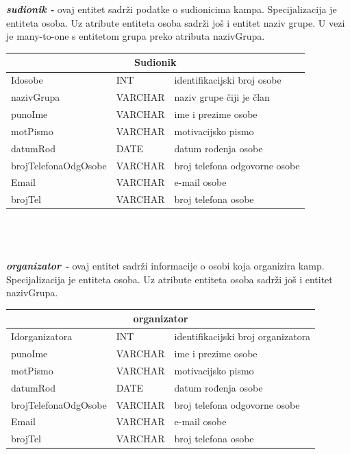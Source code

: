 \\
\\
\textbf{\textit{sudionik -}} ovaj entitet sadrži podatke o sudionicima kampa. Specijalizacija je entiteta osoba. Uz atribute entiteta osoba sadrži još i entitet naziv grupe. U vezi je many-to-one s entitetom grupa preko atributa nazivGrupa.\\
\begin{tabular}{|l|l|l|}
	
	\hline \multicolumn{3}{|c|}{\textbf{Sudionik}}\\ \hline
	
	\cellcolor{aquamarine}Idosobe & INT	&  	identifikacijski broj osobe\\ \hline
	\cellcolor{blizzardblue}nazivGrupa	& VARCHAR &   naziv grupe čiji je član	\\ \hline 
	punoIme	& VARCHAR &   ime i prezime osobe	\\ \hline 
	motPismo & VARCHAR &  motivacijsko pismo \\ \hline 
	datumRod & DATE	&  	datum rođenja osobe	\\ \hline 
	brojTelefonaOdgOsobe & 	VARCHAR	&	broj telefona odgovorne osobe \\ \hline
	Email &	VARCHAR	&	e-mail osobe \\ \hline
	brojTel	&	VARCHAR	&	broj telefona osobe \\ \hline
\end{tabular} \\ \\
\\
\textbf{\textit{organizator -}} ovaj entitet sadrži informacije o osobi koja organizira kamp. Specijalizacija je entiteta osoba. Uz atribute entiteta osoba sadrži još i entitet nazivGrupa.\\
\begin{tabular}{|l|l|l|}
	
	\hline \multicolumn{3}{|c|}{\textbf{organizator}}\\	 \hline
	
	\cellcolor{aquamarine}Idorganizatora & INT	&  	identifikacijski broj organizatora\\ \hline
	punoIme	& VARCHAR &   ime i prezime osobe	\\ \hline 
	motPismo & VARCHAR &  motivacijsko pismo \\ \hline 
	datumRod & DATE	&  	datum rođenja osobe	\\ \hline 
	brojTelefonaOdgOsobe & 	VARCHAR	&	broj telefona odgovorne osobe \\ \hline
	Email &	VARCHAR	&	e-mail osobe \\ \hline
	brojTel	&	VARCHAR	&	broj telefona osobe \\ \hline 
\end{tabular} \\ \\
